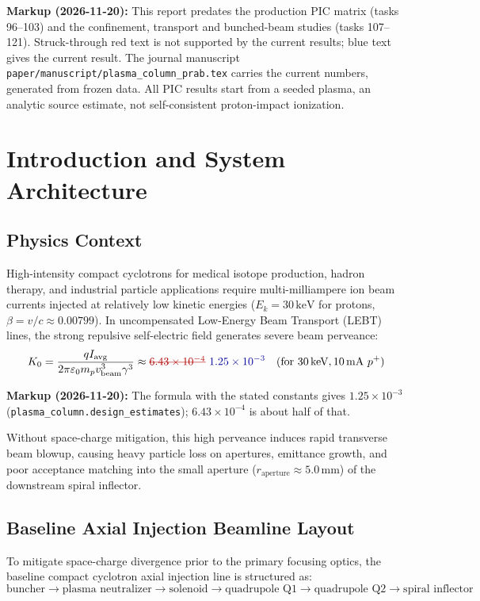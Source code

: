 \documentclass[11pt,a4paper]{article}
\newcommand{\old}[1]{\textcolor{red!70!black}{\sout{#1}}}
\newcommand{\new}[1]{\textcolor{blue!60!black}{#1}}
\newcommand{\revnote}[1]{\begin{tcolorbox}[colback=yellow!8,colframe=orange!70!black,boxrule=0.5pt,left=4pt,right=4pt,top=2pt,bottom=2pt]\small\textbf{Markup (2026-11-20):} #1\end{tcolorbox}}
\begin{document}
\revnote{This report predates the production PIC matrix (tasks 96--103) and the confinement,
transport and bunched-beam studies (tasks 107--121). Struck-through red text is not supported by
the current results; blue text gives the current result. The journal manuscript
\texttt{paper/manuscript/plasma\_column\_prab.tex} carries the current numbers, generated from
frozen data. All PIC results start from a seeded plasma, an analytic source estimate, not
self-consistent proton-impact ionization.}

\tableofcontents
\newpage

\section{Introduction and System Architecture}

\subsection{Physics Context}
High-intensity compact cyclotrons for medical isotope production, hadron therapy, and industrial particle applications require multi-milliampere ion beam currents injected at relatively low kinetic energies ($E_k = 30\,\text{keV}$ for protons, $\beta = v/c \approx 0.00799$). In uncompensated Low-Energy Beam Transport (LEBT) lines, the strong repulsive self-electric field generates severe beam perveance:
\begin{equation}
K_0 = \frac{q I_{\text{avg}}}{2\pi \varepsilon_0 m_p v_{\text{beam}}^3 \gamma^3} \approx \text{\old{$6.43 \times 10^{-4}$}}\ \text{\new{$1.25 \times 10^{-3}$}} \quad (\text{for } 30\,\text{keV}, 10\,\text{mA } p^+)
\end{equation}
\revnote{The formula with the stated constants gives $1.25\times10^{-3}$
(\texttt{plasma\_column.design\_estimates}); $6.43\times10^{-4}$ is about half of that.}
Without space-charge mitigation, this high perveance induces rapid transverse beam blowup, causing heavy particle loss on apertures, emittance growth, and poor acceptance matching into the small aperture ($r_{\text{aperture}} \approx 5.0\,\text{mm}$) of the downstream spiral inflector.

\subsection{Baseline Axial Injection Beamline Layout}
To mitigate space-charge divergence prior to the primary focusing optics, the baseline compact cyclotron axial injection line is structured as:
\begin{equation}
\text{buncher} \longrightarrow \text{plasma neutralizer} \longrightarrow \text{solenoid} \longrightarrow \text{quadrupole Q1} \longrightarrow \text{quadrupole Q2} \longrightarrow \text{spiral inflector}
\end{equation}
\end{document}

